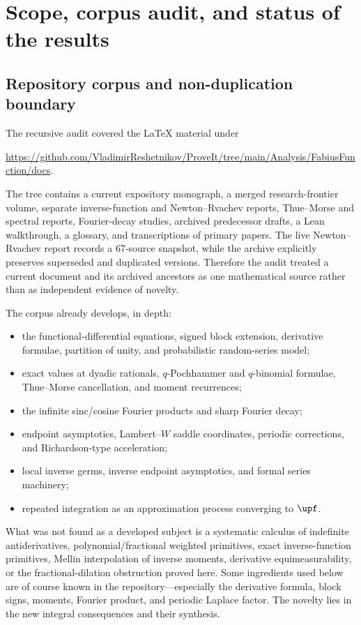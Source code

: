 \documentclass[11pt,oneside]{article}
\theoremstyle{definition}
\theoremstyle{remark}
\newcommand{\1}{\mathbf 1}
\begin{document}
\newpage

\section{Scope, corpus audit, and status of the results}

\subsection{Repository corpus and non-duplication boundary}

The recursive audit covered the LaTeX material under
\begin{center}
\url{https://github.com/VladimirReshetnikov/ProveIt/tree/main/Analysis/FabiusFunction/docs}.
\end{center}
The tree contains a current expository monograph, a merged research-frontier volume,
separate inverse-function and Newton--Rvachev reports, Thue--Morse and spectral reports,
Fourier-decay studies, archived predecessor drafts, a Lean walkthrough, a glossary,
and transcriptions of primary papers.  The live Newton--Rvachev report records a
67-source snapshot, while the archive explicitly preserves superseded and duplicated
versions.  Therefore the audit treated a current document and its archived ancestors as
one mathematical source rather than as independent evidence of novelty.

The corpus already develops, in depth:
\begin{itemize}
  \item the functional-differential equations, signed block extension, derivative
        formulae, partition of unity, and probabilistic random-series model;
  \item exact values at dyadic rationals, \(q\)-Pochhammer and \(q\)-binomial formulae,
        Thue--Morse cancellation, and moment recurrences;
  \item the infinite sinc/cosine Fourier products and sharp Fourier decay;
  \item endpoint asymptotics, Lambert--\(W\) saddle coordinates, periodic corrections,
        and Richardson-type acceleration;
  \item local inverse germs, inverse endpoint asymptotics, and formal series machinery;
  \item repeated integration as an approximation process converging to \(\upf\).
\end{itemize}

What was not found as a developed subject is a systematic calculus of indefinite
antiderivatives, polynomial/fractional weighted primitives, exact inverse-function
primitives, Mellin interpolation of inverse moments, derivative equimeasurability,
or the fractional-dilation obstruction proved here.  Some ingredients used below are
of course known in the repository---especially the derivative formula, block signs,
moments, Fourier product, and periodic Laplace factor.  The novelty lies in the new
integral consequences and their synthesis.
\end{document}
